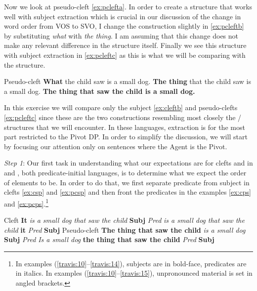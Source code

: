 \documentclass[output=paper]{langsci/langscibook}
\begin{document}
Now we look at pseudo-cleft \eqref{ex:pclefta}.  In order to create a structure
that works well with subject extraction which is crucial in our discussion of
the change in word order from VOS to SVO, I change the construction slightly in
\eqref{ex:pcleftb} by substituting \emph{what} with \emph{the thing}.  I am
assuming that this change does not make any relevant difference in the
structure itself.  Finally we see this structure with subject extraction in
\eqref{ex:pcleftc} as this is what we will be comparing with the 
structure.

\ea  Pseudo-cleft
    \ea \textbf{What} the child saw is a small dog.\label{ex:pclefta}
    \ex \textbf{The thing} that the child saw is a small dog. \label{ex:pcleftb}
    \ex \textbf{The thing that saw the child is a small dog.\label{ex:pcleftc}}
    \z
\z

In this exercise we will compare only the subject  \eqref{ex:cleftb} and
pseudo-clefts \eqref{ex:pcleftc} since these are the two constructions resembling
most closely the / structures that we will encounter.  In these
languages, extraction is for the most part restricted to the Pivot DP.  In
order to simplify the discussion, we will start by focusing our attention only
on sentences where the Agent is the Pivot.

\textit{Step 1}:  Our first task in understanding what our expectations are for
clefts and  in  and , both predicate-initial
languages, is to determine what we expect the order of elements to be.  In
order to do that, we first separate predicate from subject in clefts
\eqref{ex:csp} and  \eqref{ex:pcsp} and then front the
predicates in the  examples \eqref{ex:cps} and
\eqref{ex:pcps}.\footnote{In examples
(\ref{travis:10}--\ref{travis:14}), subjects are in bold-face, predicates are
in italics. In examples (\ref{travis:10}--\ref{travis:15}), unpronounced
material is set in angled brackets.}

\ea\label{travis:10} Cleft
    \ea \textbf{It}  \emph{is a small dog that saw the child}\label{ex:csp} \hfill \textbf{Subj} \emph{Pred}
     \ex \emph{is a small dog that saw the child } \textbf{it}\label{ex:cps} \hfill \emph{Pred} \textbf{Subj}
    \z
\ex  Pseudo-cleft
    \ea  \textbf{The thing that saw the child }  \emph{is a small dog}\label{ex:pcsp} \hfill \textbf{Subj} \emph{Pred}
     \ex \emph{Is a small dog} \textbf{the thing that saw the child} \label{ex:pcps} \hfill \emph{Pred} \textbf{Subj}
    \z
\z
\end{document}
